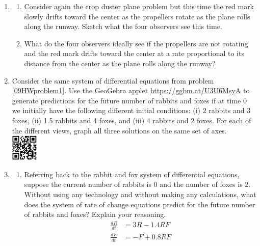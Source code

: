 \clearpage
 

\begin{enumerate}
\item \label{09HWproblem1}
\begin{enumerate}
\item Consider again the crop duster plane problem but this time the red mark slowly drifts toward the center as the propellers rotate as the plane rolls along the runway. Sketch what the four observers see this time. \label{09HWproblem1parta}
\item	What do the four observers ideally see if the propellers are not rotating and the red mark drifts toward the center at a rate proportional to its distance from the center as the plane rolls along the runway? \label{09HWproblem1partb}
\end{enumerate}
	
\item Consider the same system of differential equations from problem \ref{09HWproblem1}. Use the GeoGebra applet \href{https://ggbm.at/U3U6MsyA}{\underline{https://ggbm.at/U3U6MsyA}} to generate predictions for the future number of rabbits and foxes if at time 0 we initially have the following different initial conditions: (i) 2 rabbits and 3 foxes, (ii) 1.5 rabbits and 4 foxes, and (iii) 4 rabbits and 2 foxes. For each of the different views, graph all three solutions on the same set of axes. \label{09HWproblem2} \\

\vspace{-0.75in}\hspace{-0.7in}\includegraphics[width=0.5in]{09/09DEExplorerQR.png}

\item
\begin{enumerate}
\item Referring back to the rabbit and fox system of differential equations, suppose the current number of rabbits is 0 and the number of foxes is 2. Without using any technology and without making any calculations, what does the system of rate of change equations predict for the future number of rabbits and foxes? Explain your reasoning. \label{09HWproblem3parta}
	\begin{align*}
	\frac{dR}{dt} &= 3R-1.4RF\\
	\frac{dF}{dt} &= -F+0.8RF
\end{align*}


\end{enumerate}
\end{enumerate}
